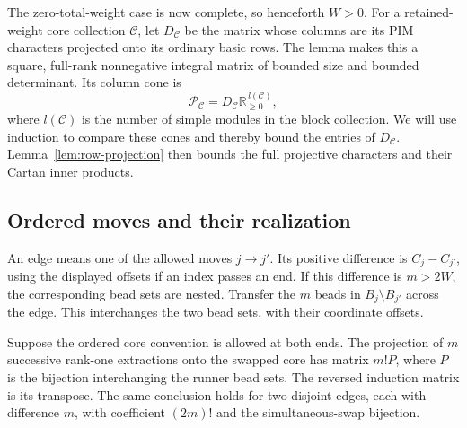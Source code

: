 The zero-total-weight case is now complete, so henceforth \(W>0\).
For a retained-weight core collection \(\mathcal C\), let
\(D_{\mathcal C}\) be the matrix whose columns are its PIM
characters projected onto its ordinary basic rows.  The lemma
makes this a square, full-rank nonnegative integral matrix of
bounded size and bounded determinant.  Its column cone is
\[
 \mathcal P_{\mathcal C}
   =D_{\mathcal C}\mathbb R_{\geq0}^{\,l(\mathcal C)},
\]
where \(l(\mathcal C)\) is the number of simple modules in the
block collection.  We will use induction to compare these cones
and thereby bound the entries of \(D_{\mathcal C}\).
Lemma~\ref{lem:row-projection} then bounds the full projective
characters and their Cartan inner products.

\subsection{Ordered moves and their realization}

An edge means one of the allowed moves \(j\to j'\).
Its positive difference is \(C_j-C_{j'}\), using the displayed
offsets if an index passes an end.  If this difference is
\(m>2W\), the corresponding bead sets are nested.  Transfer the
\(m\) beads in \(B_j\setminus B_{j'}\) across the edge.
This interchanges the two bead sets, with their coordinate offsets.

\begin{lemma}\label{run:ordered-swap}
Suppose the ordered core convention is allowed at both ends.
The projection of \(m\) successive rank-one extractions onto the
swapped core has matrix \(m!P\), where \(P\) is the bijection
interchanging the runner bead sets.  The reversed induction matrix
is its transpose.  The same conclusion holds for two disjoint
edges, each with difference \(m\), with coefficient \((2m)!\)
and the simultaneous-swap bijection.
\end{lemma}

